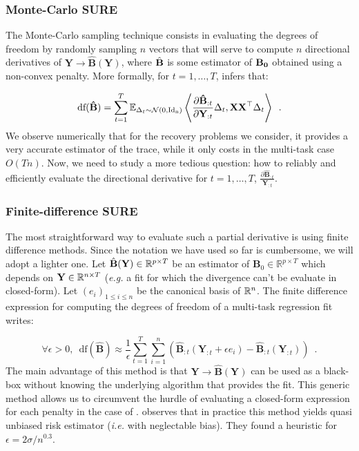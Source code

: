 \documentclass[a4paper,10pt]{article}
\theoremstyle{definition}
\begin{document}
\subsubsection*{Monte-Carlo SURE}

The Monte-Carlo sampling technique consists in evaluating the degrees of freedom by randomly sampling $n$ vectors that will serve to compute $n$ directional derivatives
of $\mathbf{Y} \rightarrow \mathbf{\hat{B}(Y)}$, where $\hat{\bf B}$ is some estimator of $\bf B_0$ obtained using a non-convex penalty.
%
More formally, for $t = 1, \dots, T$, \cite{Ramani_Blu_Unser08} infers that:

\begin{equation*}
    \text{df}(\mathbf{\hat{B}}) =
    \sum_{t=1}^T \mathbb{E}_{\Delta_t \sim \mathcal{N}(0, \text{Id}_\text{n})}
    \left \langle
            \frac{\partial \mathbf{\hat{B}}_{:t} }{
            \partial \mathbf{Y}_{:t}} \Delta_t, \mathbf{X X}^{\top} \Delta_t
    \right \rangle
    \enspace .
\end{equation*}
%
We observe numerically that for the recovery problems we consider, it provides a very accurate estimator of the trace, while
it only costs in the multi-task case $O(Tn)$. Now, we need to study a more tedious question: how to reliably and efficiently
evaluate the directional derivative for $t=1, \dots, T$, $\frac{\partial \mathbf{\hat{B}}_{:t} }{\mathbf{Y}_{:t}}$.

\subsubsection*{Finite-difference SURE}

The most straightforward way to evaluate such a partial derivative is using finite difference methods.
Since the notation we have used so far is cumbersome, we will adopt a lighter one. Let $\hat{\mathbf{B}}(\mathbf{Y}) \in \mathbb{R}^{p\times T}$ be an estimator
of $\mathbf{B}_0 \in \mathbb{R}^{p\times T}$ which depends on $\mathbf{Y} \in \mathbb{R}^{n \times T}$ (\textit{e.g.} a  fit for which the divergence
can't be evaluate in closed-form). Let $(e_i)_{1 \leq i \leq n}$ be the canonical basis of $\mathbb{R}^n$. The finite difference expression for computing
the degrees of freedom of a multi-task regression fit writes:

\begin{equation*}
    \forall \epsilon > 0, \enspace \text{df}(\mathbf{\hat{B}}) \approx
    \frac{1}{\epsilon} \sum_{t=1}^T \sum_{i=1}^n
        \left(
            \mathbf{\hat{B}}_{:t}(\mathbf{Y}_{:t} + \epsilon e_i)
            - \mathbf{\hat{B}}_{:t}(\mathbf{Y}_{:t})
        \right)
    \enspace .
\end{equation*}
%
The main advantage of this method is that $\mathbf{Y} \rightarrow \mathbf{\hat{B}(Y)}$ can be used as a black-box without knowing the underlying algorithm that provides
the fit. This generic method allows us to circumvent the hurdle of evaluating a closed-form expression for each penalty in the case of .
\cite{Deledalle_Vaiter_Fadili_Peyre14} observes that in practice this method yields quasi unbiased risk estimator (\textit{i.e.} with neglectable bias). They
found a heuristic for $\epsilon = 2 \sigma / n^{0.3}$.
\end{document}
